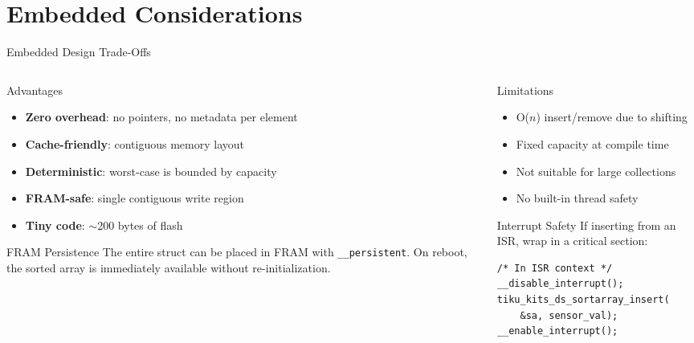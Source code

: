 \documentclass[aspectratio=169, 10pt]{beamer}
\begin{document}
\section{Embedded Considerations}

\begin{frame}{Embedded Design Trade-Offs}
\begin{columns}[T]
\begin{column}{0.48\textwidth}
\begin{block}{Advantages}
\begin{itemize}
  \item \textbf{Zero overhead}: no pointers, no metadata per element
  \item \textbf{Cache-friendly}: contiguous memory layout
  \item \textbf{Deterministic}: worst-case is bounded by capacity
  \item \textbf{FRAM-safe}: single contiguous write region
  \item \textbf{Tiny code}: $\sim$200 bytes of flash
\end{itemize}
\end{block}

\begin{block}{FRAM Persistence}
The entire struct can be placed in FRAM with
\texttt{\_\_persistent}. On reboot, the sorted array
is immediately available without re-initialization.
\end{block}
\end{column}

\begin{column}{0.48\textwidth}
\begin{block}{Limitations}
\begin{itemize}
  \item O($n$) insert/remove due to shifting
  \item Fixed capacity at compile time
  \item Not suitable for large collections
  \item No built-in thread safety
\end{itemize}
\end{block}

\begin{block}{Interrupt Safety}
If inserting from an ISR, wrap in a critical section:
\end{block}
\begin{lstlisting}[style=cstyle, basicstyle=\ttfamily\tiny]
/* In ISR context */
__disable_interrupt();
tiku_kits_ds_sortarray_insert(
    &sa, sensor_val);
__enable_interrupt();
\end{lstlisting}
\end{column}
\end{columns}
\end{frame}
\end{document}
